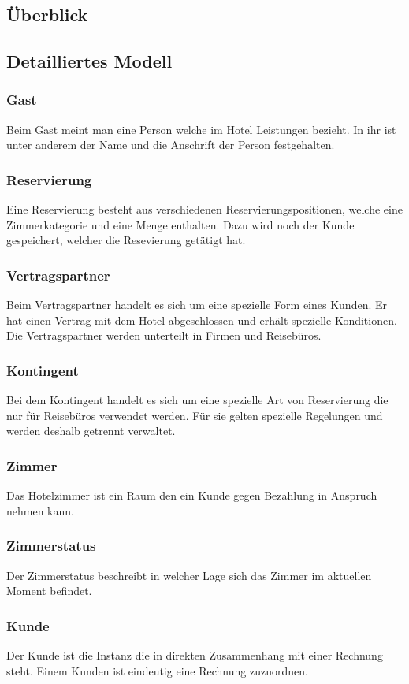 \documentclass[10pt,a4paper,titlepage]{article}
\begin{document}
\subsection{Überblick}
\subsection{Detailliertes Modell}
\subsubsection{Gast}
Beim Gast meint man eine Person welche im Hotel Leistungen bezieht. In ihr ist unter anderem der Name und die Anschrift der Person festgehalten.
\subsubsection{Reservierung}
Eine Reservierung besteht aus verschiedenen Reservierungspositionen, welche eine Zimmerkategorie und eine Menge enthalten. Dazu wird noch der Kunde gespeichert, welcher die Resevierung getätigt hat.
\subsubsection{Vertragspartner}
Beim Vertragspartner handelt es sich um eine spezielle Form eines Kunden. Er hat einen Vertrag mit dem Hotel abgeschlossen und erhält spezielle Konditionen. Die Vertragspartner werden unterteilt in Firmen und Reisebüros.
\subsubsection{Kontingent}
Bei dem Kontingent handelt es sich um eine spezielle Art von Reservierung die nur für Reisebüros verwendet werden. Für sie gelten spezielle Regelungen und werden deshalb getrennt verwaltet.
\subsubsection{Zimmer}
Das Hotelzimmer ist ein Raum den ein Kunde gegen Bezahlung in Anspruch nehmen kann.
\subsubsection{Zimmerstatus}
Der Zimmerstatus beschreibt in welcher Lage sich das Zimmer im aktuellen Moment befindet.
\subsubsection{Kunde}
Der Kunde ist die Instanz die in direkten Zusammenhang mit einer Rechnung steht.
Einem Kunden ist eindeutig eine Rechnung zuzuordnen.
\end{document}
